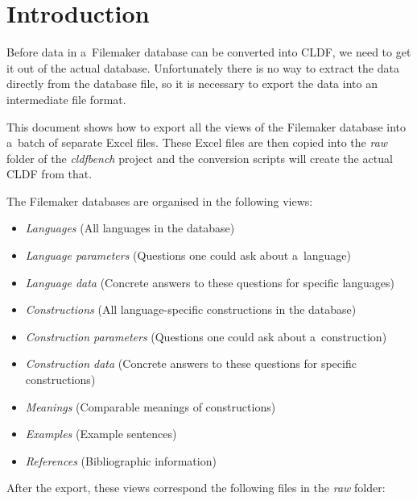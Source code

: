 \documentclass[12pt,a4paper]{scrartcl}
\title{\Title{}}
\date{8 Oct 2020}
\begin{document}
\section{Introduction}%
\label{sec:intro}

Before data in a~Filemaker database can be converted into CLDF, we need to get
it out of the actual database.
Unfortunately there is no way to extract the data directly from the database
file, so it is necessary to export the data into an intermediate file format.

This document shows how to export all the views of the Filemaker database into
a~batch of separate Excel files.
These Excel files are then copied into the \emph{raw} folder of the
\emph{cldfbench} project and the conversion scripts will create the actual CLDF
from that.

The Filemaker databases are organised in the following views:

\begin{itemize}
  \item \emph{Languages} (All languages in the database)
  \item \emph{Language parameters} (Questions one could ask about a~language)
  \item \emph{Language data} (Concrete answers to these questions for specific languages)
  \item \emph{Constructions} (All language-specific constructions in the database)
  \item \emph{Construction parameters} (Questions one could ask about a~construction)
  \item \emph{Construction data} (Concrete answers to these questions for specific constructions)
  \item \emph{Meanings} (Comparable meanings of constructions)
  \item \emph{Examples} (Example sentences)
  \item \emph{References} (Bibliographic information)
\end{itemize}

After the export, these views correspond the following files in the \emph{raw}
folder:
\end{document}
